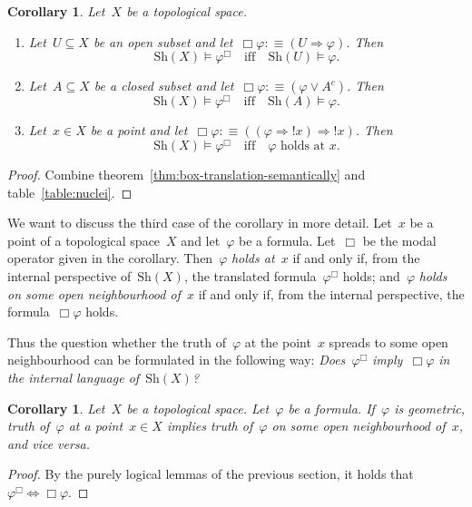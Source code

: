 \documentclass[10pt]{amsart}
\theoremstyle{definition}
\theoremstyle{plain}
\newtheorem{cor}[defn]{Corollary}
\theoremstyle{remark}
\newcommand{\Sh}{\mathrm{Sh}}
\newcommand{\?}{\,{:}\,}
\renewcommand{\_}{\mathpunct{.}\,}
\newcommand{\notat}[1]{{!#1}}
\begin{document}
\begin{cor}Let~$X$ be a topological space.
\begin{enumerate}
\item Let~$U \subseteq X$ be an open subset and let~$\Box\varphi :\equiv (U
\Rightarrow \varphi)$. Then
\[ \Sh(X) \models \varphi^\Box \quad\text{iff}\quad \Sh(U) \models \varphi. \]
\item Let~$A \subseteq X$ be a closed subset and let~$\Box\varphi :\equiv
(\varphi \vee A^c)$. Then
\[ \Sh(X) \models \varphi^\Box \quad\text{iff}\quad \Sh(A) \models \varphi. \]
\item Let~$x \in X$ be a point and let~$\Box\varphi :\equiv ((\varphi
\Rightarrow \notat{x}) \Rightarrow \notat{x})$. Then
\[ \Sh(X) \models \varphi^\Box \quad\text{iff}\quad \text{$\varphi$ holds
at~$x$}. \]
\end{enumerate}
\end{cor}
\begin{proof}Combine theorem~\ref{thm:box-translation-semantically} and
table~\ref{table:nuclei}.\end{proof}

We want to discuss the third case of the corollary in more detail. Let~$x$ be a
point of a topological space~$X$ and let~$\varphi$ be a formula. Let~$\Box$ be
the modal operator given in the corollary. Then~$\varphi$ \emph{holds at~$x$}
if and only if, from the internal perspective of~$\Sh(X)$, the translated
formula~$\varphi^\Box$ holds; and~$\varphi$ \emph{holds on some open
neighbourhood of~$x$} if and only if, from the internal perspective, the
formula~$\Box\varphi$ holds.

Thus the question whether the truth of~$\varphi$ at the point~$x$ spreads to
some open neighbourhood can be formulated in the following way:
\emph{Does~$\varphi^\Box$ imply~$\Box\varphi$ in the internal language
of~$\Sh(X)$?}

\begin{cor}\label{cor:geometric-spreading}
Let~$X$ be a topological space. Let~$\varphi$ be a formula.
If~$\varphi$ is geometric, truth of~$\varphi$ at a point~$x \in X$ implies
truth of~$\varphi$ on some open neighbourhood of~$x$, and vice versa.\end{cor}
\begin{proof}By the purely logical lemmas of the previous section, it holds
that~$\varphi^\Box \Leftrightarrow \Box\varphi$.
\end{proof}
\end{document}
